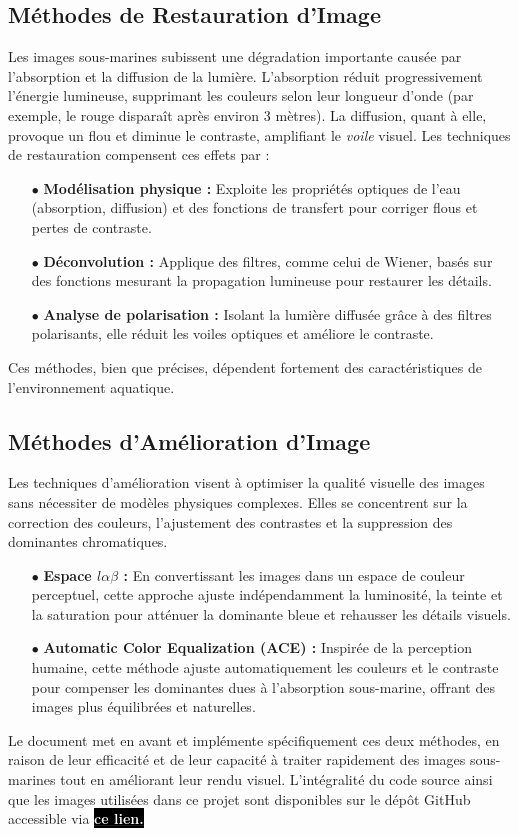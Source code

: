 \documentclass[10pt, a4paper]{extarticle}
\numberwithin{equation}{section}
\numberwithin{figure}{section}
\begin{document}
\subsection{Méthodes de Restauration d'Image}
\par Les images sous-marines subissent une dégradation importante causée par l'absorption et la diffusion de la lumière. L'absorption réduit progressivement l'énergie lumineuse, supprimant les couleurs selon leur longueur d'onde (par exemple, le rouge disparaît après environ 3 mètres). La diffusion, quant à elle, provoque un flou et diminue le contraste, amplifiant le \textit{voile} visuel. Les techniques de restauration compensent ces effets par :
\begin{itemize}
\item[$\bullet$] \textbf{Modélisation physique :} Exploite les propriétés optiques de l'eau (absorption, diffusion) et des fonctions de transfert pour corriger flous et pertes de contraste.
\item[$\bullet$] \textbf{Déconvolution :} Applique des filtres, comme celui de Wiener, basés sur des fonctions mesurant la propagation lumineuse pour restaurer les détails.
\item[$\bullet$] \textbf{Analyse de polarisation :} Isolant la lumière diffusée grâce à des filtres polarisants, elle réduit les voiles optiques et améliore le contraste.
\end{itemize}
Ces méthodes, bien que précises, dépendent fortement des caractéristiques de l’environnement aquatique.

\subsection{Méthodes d'Amélioration d'Image}

\par Les techniques d’amélioration visent à optimiser la qualité visuelle des images sans nécessiter de modèles physiques complexes. Elles se concentrent sur la correction des couleurs, l'ajustement des contrastes et la suppression des dominantes chromatiques.
\begin{itemize}
\item[$\bullet$] \textbf{Espace $l\alpha\beta$ :} En convertissant les images dans un espace de couleur perceptuel, cette approche ajuste indépendamment la luminosité, la teinte et la saturation pour atténuer la dominante bleue et rehausser les détails visuels.
\item[$\bullet$] \textbf{Automatic Color Equalization (ACE) :} Inspirée de la perception humaine, cette méthode ajuste automatiquement les couleurs et le contraste pour compenser les dominantes dues à l’absorption sous-marine, offrant des images plus équilibrées et naturelles.
\end{itemize}
Le document met en avant et implémente spécifiquement ces deux méthodes, en raison de leur efficacité et de leur capacité à traiter rapidement des images sous-marines tout en améliorant leur rendu visuel. L'intégralité du code source ainsi que les images utilisées dans ce projet sont disponibles sur le dépôt GitHub accessible via \href{https://github.com/fouakh/Project-IMA201}{\colorbox{black}{\textcolor{white}{\textbf{ce lien.}}}}
\end{document}
